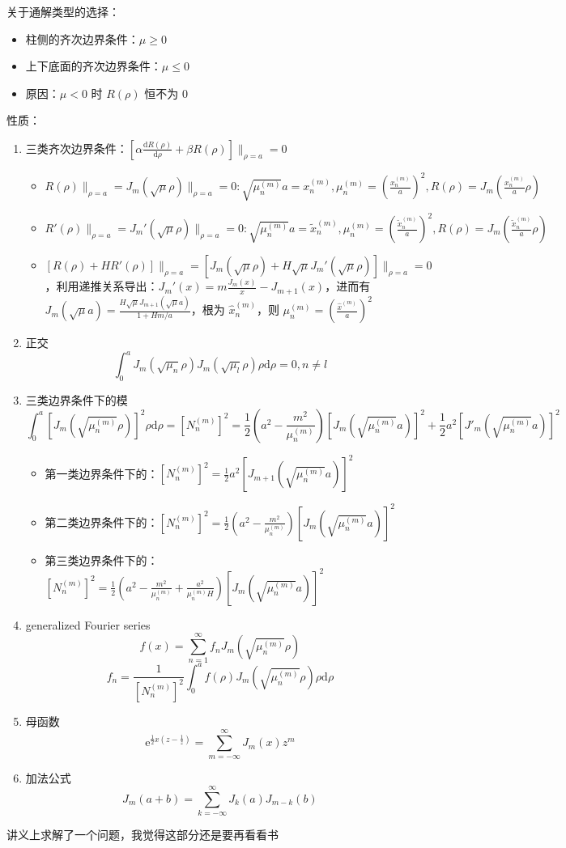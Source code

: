 \documentclass{article}
\begin{document}
关于通解类型的选择：
\begin{itemize}
    \item 柱侧的齐次边界条件：$\mu\geq 0$
    \item 上下底面的齐次边界条件：$\mu\leq 0$
    \item 原因：$\mu<0$ 时 $R(\rho)$ 恒不为 0
\end{itemize}
性质：
\begin{enumerate}
    \item 三类齐次边界条件：$[\alpha\frac{\mathrm{d}R(\rho)}{\mathrm{d}\rho}+\beta R(\rho)]\|_{\rho=a}=0$ \begin{itemize}
        \item $R(\rho)\|_{\rho=a}=J_m(\sqrt{\mu}\rho)\|_{\rho=a}=0: \sqrt{\mu^{(m)}_n}a=x^{(m)}_n,\mu^{(m)}_n=(\frac{x^{(m)}_n}{a})^2, R(\rho)=J_m(\frac{x^{(m)}_n}{a}\rho)$
        \item $R'(\rho)\|_{\rho=a}=J_m'(\sqrt{\mu}\rho)\|_{\rho=a}=0: \sqrt{\mu^{(m)}_n}a=\tilde x^{(m)}_n,\mu^{(m)}_n=(\frac{\tilde x^{(m)}_n}{a})^2, R(\rho)=J_m(\frac{\tilde x^{(m)}_n}{a}\rho)$
        \item $[R(\rho)+HR'(\rho)]\|_{\rho=a}=[J_m(\sqrt{\mu}\rho)+H\sqrt{\mu}J_m'(\sqrt{\mu}\rho)]\|_{\rho=a}=0$，利用递推关系导出：$J_m'(x)=m\frac{J_m(x)}{x}-J_{m+1}(x)$，进而有 $J_m(\sqrt\mu a)=\frac{H\sqrt\mu J_{m+1}(\sqrt\mu a)}{1+Hm/a}$，根为 $\hat x^{(m)}_n$，则 $\mu^{(m)}_n=(\frac{\hat x^{(m)}}{a})^2$
    \end{itemize}
    \item 正交 $$\int^a_0J_m(\sqrt{\mu_n}\rho)J_m(\sqrt{\mu_l}\rho)\rho\mathrm{d}\rho=0, n\neq l$$
    \item 三类边界条件下的模 $$\int^a_0[J_m(\sqrt{\mu^{(m)}_n}\rho)]^2\rho\mathrm{d}\rho=[N^{(m)}_n]^2=\frac{1}{2}(a^2-\frac{m^2}{\mu^{(m)}_n})[J_m(\sqrt{\mu^{(m)}_n}a)]^2+\frac{1}{2}a^2[J'_m(\sqrt{\mu^{(m)}_n}a)]^2$$ \begin{itemize}
        \item 第一类边界条件下的：$[N^{(m)}_n]^2=\frac{1}{2}a^2[J_{m+1}(\sqrt{\mu^{(m)}_n}a)]^2$
        \item 第二类边界条件下的：$[N^{(m)}_n]^2=\frac 1 2(a^2-\frac{m^2}{\mu^{(m)}_n})[J_m(\sqrt{\mu^{(m)}_n}a)]^2$
        \item 第三类边界条件下的：$[N^{(m)}_n]^2=\frac 1 2(a^2-\frac{m^2}{\mu^{(m)}_n}+\frac{a^2}{\mu^{(m)}_nH})[J_m(\sqrt{\mu^{(m)}_n}a)]^2$
    \end{itemize}
    \item generalized Fourier series $$f(x)=\sum^\infty_{n=1}f_nJ_m(\sqrt{\mu^{(m)}_n}\rho)$$ $$f_n=\frac{1}{[N^{(m)}_n]^2}\int^a_0f(\rho)J_m(\sqrt{\mu^{(m)}_n}\rho)\rho\mathrm{d}\rho$$
    \item 母函数 $$\mathrm{e}^{\frac{1}{2}x(z-\frac{1}{z})}=\sum^\infty_{m=-\infty}J_m(x)z^m$$
    \item 加法公式 $$J_m(a+b)=\sum^\infty_{k=-\infty}J_k(a)J_{m-k}(b)$$
\end{enumerate}
讲义上求解了一个问题，我觉得这部分还是要再看看书
\end{document}
